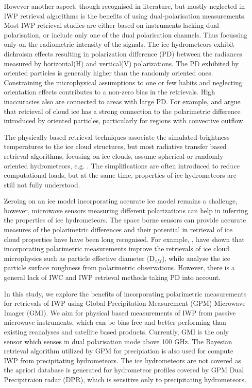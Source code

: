 \documentclass[amt, manuscript]{copernicus}
\begin{document}
However another aspect, though recognised in literature, but mostly neglected in IWP retrieval algorithms is the benefits of using dual-polarisation measurements. Most IWP retrieval studies are either based on instruments lacking dual-polarisation, or include only one of the dual polarisation channels. Thus focussing only on the radiometric intensity of the signals. The ice hydrometeors exhibit dichroism effects resulting in polarization difference (PD) between the radiances measured by horizontal(H) and vertical(V) polarizations. The PD exhibited by oriented particles is generally higher than the randomly oriented ones. Constraining the microphysical assumptions to one or few habits and neglecting  orientation effects contributes to a non-zero bias in the retrievals. High inaccuracies also are connected to areas with large PD. For example, \citet{gong:micro:17} and \citep{miao:thepo:03} argue that retrieval of cloud ice has a strong connection to the polarimetric difference introduced by oriented particles, particularly for regions with convective outflow. 

The physically based retrieval techniques associate the simulated brightness temperatures to the ice cloud structures, but most radiative transfer based retrieval algorithms, focusing on ice clouds, assume spherical or randomly oriented hydrometeors, e.g. \citep{evans:icecl:05, Zhao:retri:02}. The simplifications are often introduced to reduce computational loads, but at the same time, properties of ice-hydrometeors are still not fully understood. 

Zeroing on an ice model incorporating accurate ice model remains a challenge, however, microwave sensors measuring different polarizations can help in inferring the properties of ice hydrometeors. The space borne sensors can provide accurate measures of the polarimetric differences and their potential in retrieval of ice cloud properties have have been long recognised. For example, \citep{coy:sensi:20}, have shown  that incorporating polarimetric measurements improve the retrievals of ice cloud microphysics such as particle effective diameter (D$_{eff}$), while \citep{hioki:degre:16} analyse the ice particle surface roughness from polarimetric observations. However, there is a general lack of  IWC and IWP retrieval methods taking PD into account.

In this study, we explore the benefits of incorporating polarimetric measurements for retrievals of IWP using Global Precipitation Measurement (GPM) Microwave Imager (GMI). We aim for physical based measurements of IWP from passive microwave instruments, which can be bias-free and better performing than existing reanalyses and satellite based products. Currently, GMI is the only sensor which senses in dual polarisation mode above 100\,\,GHz. The Bayesian retrieval algorithm utilized by GPM for precipiation is also used for compute IWP from precipitating hydrometeors. The ice hydrometeors are not covered as the apriori database is generated for hydrometeor profiles covered by GPM Dual Precipitraion radar (DPR), which is sensitive only to precipitating hydrometeors. 
\end{document}
